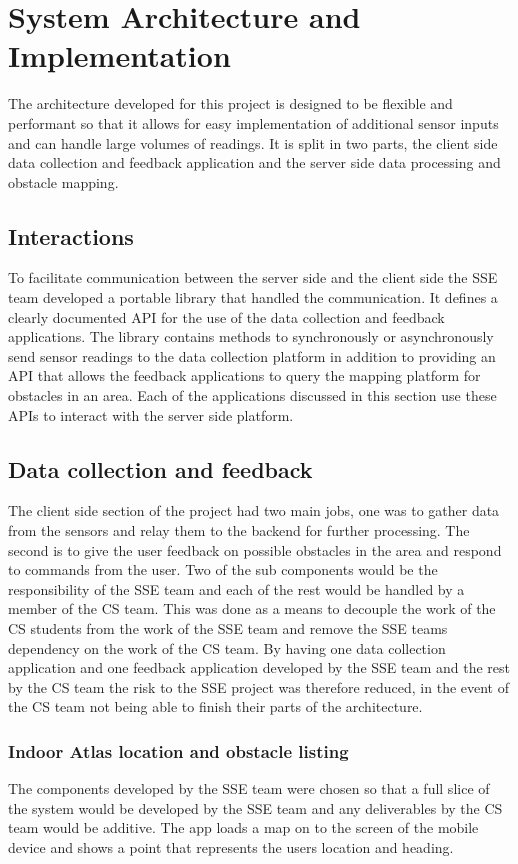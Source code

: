 \documentclass[prodmode,acmtosem]{acmsmall} %
\begin{document}
\section{System Architecture and Implementation}
\label{sec:architecture}
The architecture developed for this project is designed to be flexible and performant so that it allows for easy implementation of additional sensor inputs and can handle large volumes of readings. It is split in two parts, the client side data collection and feedback application and the server side data processing and obstacle mapping.

\subsection{Interactions}
\label{sec:interactions}
To facilitate communication between the server side and the client side the SSE team developed a portable library that handled the communication. It defines a clearly documented API for the use of the data collection and feedback applications. The library contains methods to synchronously or asynchronously send sensor readings to the data collection platform in addition to providing an API that allows the feedback applications to query the mapping platform for obstacles in an area. Each of the applications discussed in this section use these APIs to interact with the server side platform.

\subsection{Data collection and feedback}
The client side section of the project had two main jobs, one was to gather data from the sensors and relay them to the backend for further processing. The second is to give the user feedback on possible obstacles in the area and respond to commands from the user. Two of the sub components would be the responsibility of the SSE team and each of the rest would be handled by a member of the CS team. This was done as a means to decouple the work of the CS students from the work of the SSE team and remove the SSE teams dependency on the work of the CS team. By having one data collection application and one feedback application developed by the SSE team and the rest by the CS team the risk to the SSE project was therefore reduced, in the event of the CS team not being able to finish their parts of the architecture.

\subsubsection{Indoor Atlas location and obstacle listing}
The components developed by the SSE team were chosen so that a full slice of the system would be developed by the SSE team and any deliverables by the CS team would be additive. The app loads a map on to the screen of the mobile device and shows a point that represents the users location and heading.
\end{document}
